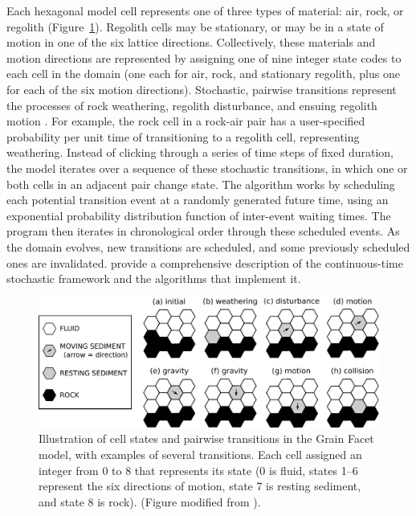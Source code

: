 Each hexagonal model cell represents one of three types of material: air, rock, or regolith (Figure~\ref{fig:cellstates}). Regolith cells may be stationary, or may be in a state of motion in one of the six lattice directions. Collectively, these materials and motion directions are represented by assigning one of nine integer state codes to each cell in the domain (one each for air, rock, and stationary regolith, plus one for each of the six motion directions). Stochastic, pairwise transitions represent the processes of rock weathering, regolith disturbance, and ensuing regolith motion \citep{tucker2016celllab,tucker2018lattice}. For example, the rock cell in a rock-air pair has a user-specified probability per unit time of transitioning to a regolith cell, representing weathering. Instead of clicking through a series of time steps of fixed duration, the model iterates over a sequence of these stochastic transitions, in which one or both cells in an adjacent pair change state. The algorithm works by scheduling each potential transition event at a randomly generated future time, using an exponential probability distribution function of inter-event waiting times. The program then iterates in chronological order through these scheduled events. As the domain evolves, new transitions are scheduled, and some previously scheduled ones are invalidated. \citet{tucker2016celllab} provide a comprehensive description of the continuous-time stochastic framework and the algorithms that implement it.

\begin{figure}[ht!]
\centerline{\includegraphics[scale=0.7]{Figures/cell_states_and_transitions.pdf}}
\caption{Illustration of cell states and pairwise transitions in the Grain Facet model, with examples of several transitions. Each cell assigned an integer from 0 to 8 that represents its state (0 is fluid, states 1--6 represent the six directions of motion, state 7 is resting sediment, and state 8 is rock). (Figure modified from \citet{tucker2018lattice}).}
\label{fig:cellstates}
\end{figure}

